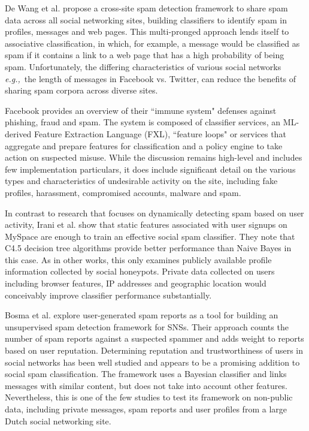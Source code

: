 \documentclass[preprint]{acm_proc_article-sp}
\newcommand{\eg}{{\em e.g.,}~}
\begin{document}
De Wang et al. \cite{wang} propose a cross-site spam detection framework to share 
spam data across all social networking sites, building classifiers to identify spam 
in profiles, messages and web pages. This multi-pronged approach lends itself to 
associative classification, in which, for example, a message would be classified as 
spam if it contains a link to a web page that has a high probability of being spam. 
Unfortunately, the differing characteristics of various social networks \eg the length 
of messages in Facebook vs. Twitter, can reduce the benefits of sharing spam corpora 
across diverse sites.

Facebook \cite{stein} provides an overview of their ``immune system" defenses 
against phishing, fraud and spam. The system is composed of classifier services, an 
ML-derived Feature Extraction Language (FXL), ``feature loops" or services that aggregate 
and prepare features for classification and a policy engine to take action on suspected misuse. While 
the discussion remains high-level and includes few implementation particulars, it does 
include significant detail on the various types and characteristics of undesirable 
activity on the site, including fake profiles, harassment, compromised accounts, malware 
and spam. 

In contrast to research that focuses on dynamically detecting spam based on user 
activity, Irani et al. \cite{irani} show that static features associated with user signups 
on MySpace are enough to train an effective social spam classifier. They note that
C4.5 decision tree algorithms provide better performance than Naive Bayes in this case. 
As in other works, this only examines publicly available profile information collected 
by social honeypots. Private data collected on users including browser features, IP addresses 
and geographic location would conceivably improve classifier performance substantially.

Bosma et al. \cite{bosma} explore user-generated spam reports as a tool for building an unsupervised 
spam detection framework for SNSs. Their approach counts the number of spam reports against a 
suspected spammer and adds weight to reports based on user reputation. Determining reputation 
and trustworthiness of users in social networks has been well studied \cite{bian, guha, zhang} 
and appears to be a promising addition to social spam classification. The framework uses a 
Bayesian classifier and links messages with similar content, but does not take into account 
other features. Nevertheless, this is one of the few studies to test its framework on 
non-public data, including private messages, spam reports and user profiles from a 
large Dutch social networking site.
\end{document}
